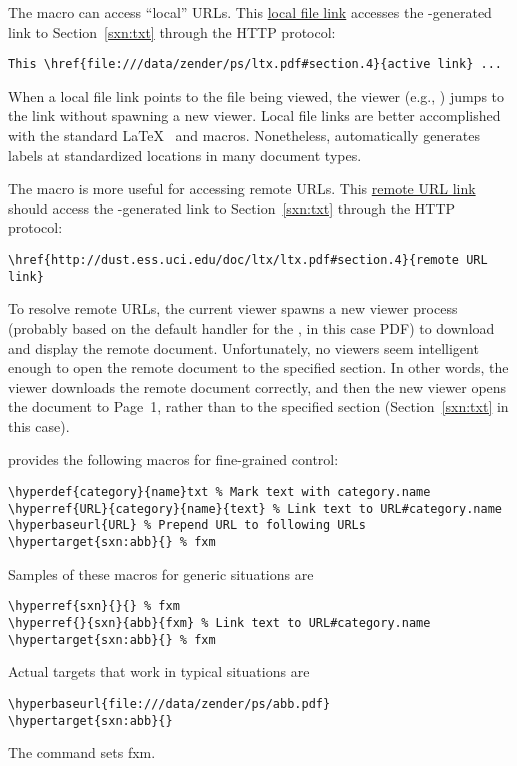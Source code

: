 \documentclass[12pt]{article}
\begin{document}
The \cmdidx{\href} macro can access ``local'' URLs.
This \href{file:///data/zender/ps/ltx.pdf#section.4}{local file link}
accesses the -generated link to Section~\ref{sxn:txt}
through the HTTP  protocol:  
\begin{verbatim}
This \href{file:///data/zender/ps/ltx.pdf#section.4}{active link} ...
\end{verbatim}
When a local file link points to the file being viewed, the viewer
(e.g., ) jumps to the link without spawning a new
viewer. 
Local file links are better accomplished with the standard \LaTeX\
\cmdltxidx{\label} and \cmdltxidx{\ref} macros.
Nonetheless,  automatically generates labels at
standardized locations in many document types.

The \cmdidx{\href} macro is more useful for accessing remote URLs.
This 
\href{http://dust.ess.uci.edu/doc/ltx/ltx.pdf#section.4}{remote URL link}
should access the \cmdprn{hyperref}-generated link to
Section~\ref{sxn:txt} through the HTTP  protocol: 
\begin{verbatim}
\href{http://dust.ess.uci.edu/doc/ltx/ltx.pdf#section.4}{remote URL link} 
\end{verbatim}
To resolve remote URLs, the current viewer spawns a new viewer process
(probably based on the default handler for the \trmidx{mime-type}, in
this case PDF) to download and display the remote document.
Unfortunately, no viewers seem intelligent enough to open the remote
document to the specified section.
In other words, the viewer downloads the remote document correctly,
and then the new viewer opens the document to Page~1, rather than to
the specified section (Section~\ref{sxn:txt} in this case).

 provides the following macros for fine-grained control:
\begin{verbatim}
\hyperdef{category}{name}txt % Mark text with category.name
\hyperref{URL}{category}{name}{text} % Link text to URL#category.name
\hyperbaseurl{URL} % Prepend URL to following URLs
\hypertarget{sxn:abb}{} % fxm
\end{verbatim}
Samples of these macros for generic situations are
\begin{verbatim}
\hyperref{sxn}{}{} % fxm
\hyperref{}{sxn}{abb}{fxm} % Link text to URL#category.name
\hypertarget{sxn:abb}{} % fxm
\end{verbatim}
Actual targets that work in typical situations are
\begin{verbatim}
\hyperbaseurl{file:///data/zender/ps/abb.pdf}
\hypertarget{sxn:abb}{}
\end{verbatim}
The \cmdltxidx{\hypertarget} command sets fxm.
\end{document}
